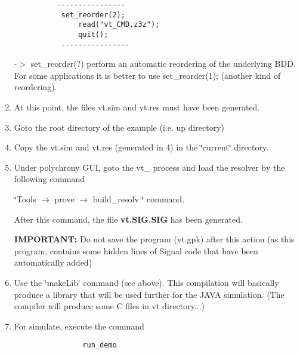 \begin{enumerate}
\footnotesize\begin{verbatim}	       ----------------
	       set_reorder(2); 
               read("vt_CMD.z3z");
               quit();
	       ----------------
	     \end{verbatim}
\normalsize
 -$>$ set\_\-reorder(?) perform an automatic reordering of the underlying BDD. For some applications it is better to use set\_\-reorder(1); (another kind of reordering).\item At this point, the files vt.sim and vt.res must have been generated.\item Goto the root directory of the example (i.e. up directory)\item Copy the vt.sim and vt.res (generated in 4) in the \char`\"{}current\char`\"{} directory.\item Under polychrony GUI, goto the vt\_ process and load the resolver by the following command \par
 \char`\"{}Tools  $\rightarrow$  prove  $\rightarrow$  build\_\-resolv \char`\"{} command.\par
 After this command, the file {\bf vt.SIG.SIG} has been generated.\par
 {\bf IMPORTANT:} Do not save the program (vt.gpk) after this action (as this program, contains some hidden lines of Signal code that have been automatically added)\item Use the \char`\"{}make\-Lib\char`\"{} command (see above). This compilation will basically produce a library that will be used further for the JAVA simulation. (The compiler will produce some C files in vt directory...)\item For simulate, execute the command 

\footnotesize\begin{verbatim}                run_demo
              \end{verbatim}
\normalsize
 \end{enumerate}
